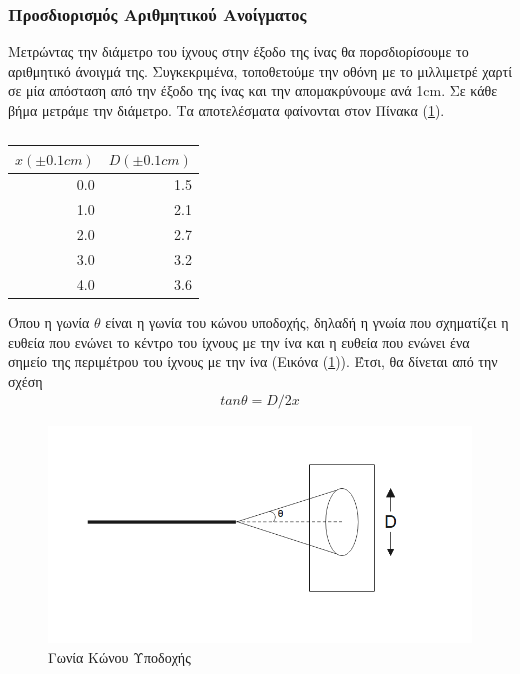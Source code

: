 \documentclass[a4paper]{article}
\begin{document}
	\subsubsection*{Προσδιορισμός Αριθμητικού Ανοίγματος}
		Μετρώντας την διάμετρο του ίχνους στην έξοδο της ίνας θα πορσδιορίσουμε το αριθμητικό άνοιγμά της. Συγκεκριμένα, τοποθετούμε την οθόνη με το μιλλιμετρέ χαρτί σε μία απόσταση από την έξοδο της ίνας και την απομακρύνουμε ανά 1cm. Σε κάθε βήμα μετράμε την διάμετρο. Τα αποτελέσματα φαίνονται στον Πίνακα (\ref{mat2}).
		\begin{table}[h!]
			\centering
			\begin{tabular}{|r|r|}%
				\hline
				$x(\pm0.1cm)$ & $D(\pm0.1cm)$ \\%
				\hline\hline
				0.0 & 1.5 \\\hline %
				1.0 & 2.1 \\\hline %
				2.0 & 2.7 \\\hline %
				3.0 & 3.2 \\\hline %
				4.0 & 3.6 \\\hline %
			\end{tabular}
			\caption{ }
			\label{mat2}
		\end{table}
		
		Όπου η γωνία $\theta$ είναι η γωνία του κώνου υποδοχής, δηλαδή η γνωία που σχηματίζει η ευθεία που ενώνει το κέντρο του ίχνους με την ίνα και η ευθεία που ενώνει ένα σημείο της περιμέτρου του ίχνους με την ίνα (Εικόνα (\ref{Im1})). Έτσι, θα δίνεται από την σχέση 
		\begin{align}\label{4}	
			tan\theta=D/2x
		\end{align}
		\begin{figure}[h!]
			\centering
			\includegraphics[scale=0.35]{konos_ypodoxhs.png}
			\caption{Γωνία Κώνου Υποδοχής}
			\label{Im1}
		\end{figure}
		
\end{document}
